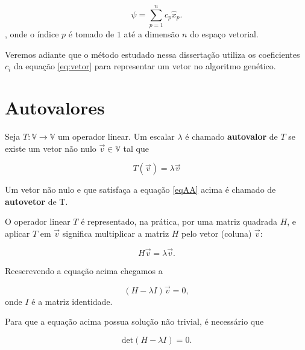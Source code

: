 \begin{equation}\label{eq:vetor}
	\psi = \sum_{p=1}^n c_p \hat{x}_p.
\end{equation},
onde o índice $p$ é tomado de $1$ até a dimensão $n$ do espaço vetorial.


Veremos adiante que o método estudado nessa dissertação utiliza os coeficientes $c_i$ da equação \ref{eq:vetor} para representar um vetor no algoritmo genético.

\section{Autovalores}
	\begin{mydef}
	
		Seja $T: \mathbb{V} \rightarrow \mathbb{V}$ um operador linear. Um escalar $\lambda$ é chamado \textbf{autovalor} de $T$ se existe um vetor não nulo $\vec{v} \in \mathbb{V}$ tal que
		
		\begin{equation}\label{eqAA}
			T(\vec{v}) = \lambda \vec{v}
		\end{equation}
		
		Um vetor não nulo e que satisfaça a equação \ref{eqAA} acima é chamado de \textbf{autovetor} de T.
		
	\end{mydef}
	
	\vspace{1cm}
	
	O operador linear $T$	é representado, na prática, por uma matriz quadrada $H$, e aplicar $T$ em $\vec{v}$ significa multiplicar a matriz $H$ pelo vetor (coluna) $\vec{v}$:
	
	\begin{equation}
		H\vec{v} = \lambda \vec{v}.
	\end{equation}
	
	Reescrevendo a equação acima chegamos a 
	
	\begin{equation}\label{eqEqMatricial}
		(H - \lambda I)\vec{v} = 0,
	\end{equation}
	onde $I$ é a matriz identidade.
	
	Para que a equação acima possua solução não trivial, é necessário que
	
	\begin{equation}\label{eqDeterminanteZeto}	
		\mbox{det}(H - \lambda I) = 0.
	\end{equation}
	
